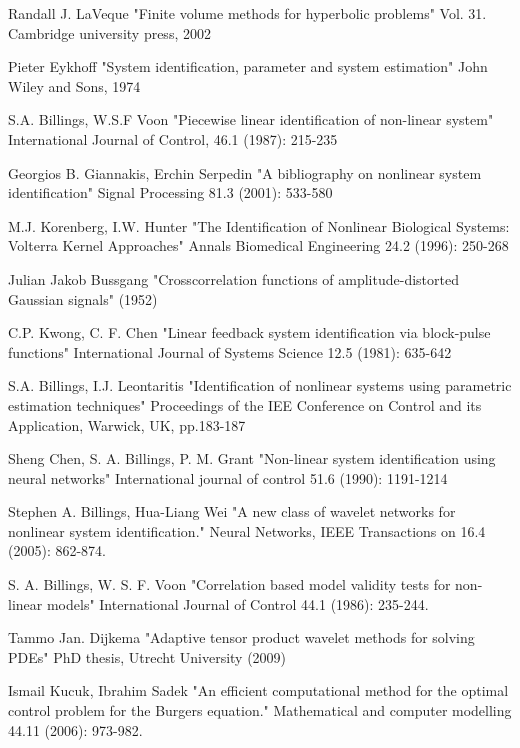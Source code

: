 \documentclass[a4paper,onecolumn]{article}
\theoremstyle{remark}
\begin{document}
\begin{thebibliography}{9}
Randall J. LaVeque
"Finite volume methods for hyperbolic problems"
Vol. 31. Cambridge university press, 2002

Pieter Eykhoff
"System identification, parameter and system estimation"
John Wiley and Sons, 1974

S.A. Billings, W.S.F Voon
"Piecewise linear identification of non-linear system"
International Journal of Control, 46.1 (1987): 215-235

Georgios B. Giannakis, Erchin Serpedin
"A bibliography on nonlinear system identification"
Signal Processing 81.3 (2001): 533-580

M.J. Korenberg, I.W. Hunter
"The Identification of Nonlinear Biological Systems: Volterra Kernel Approaches"
Annals Biomedical Engineering 24.2 (1996): 250-268

Julian Jakob Bussgang
"Crosscorrelation functions of amplitude-distorted Gaussian signals" 
(1952)

C.P. Kwong, C. F. Chen
"Linear feedback system identification via block-pulse functions"
International Journal of Systems Science 12.5 (1981): 635-642

S.A. Billings, I.J. Leontaritis
"Identification of nonlinear systems using parametric estimation techniques"
Proceedings of the IEE Conference on Control and its Application, Warwick, UK, pp.183-187

Sheng Chen, S. A. Billings, P. M. Grant
"Non-linear system identification using neural networks" 
International journal of control 51.6 (1990): 1191-1214

Stephen A. Billings, Hua-Liang Wei
"A new class of wavelet networks for nonlinear system identification."
Neural Networks, IEEE Transactions on 16.4 (2005): 862-874.

S. A. Billings, W. S. F. Voon
"Correlation based model validity tests for non-linear models"
International Journal of Control 44.1 (1986): 235-244.

Tammo Jan. Dijkema
"Adaptive tensor product wavelet methods for solving PDEs"
PhD thesis, Utrecht University (2009)

Ismail Kucuk,  Ibrahim Sadek
"An efficient computational method for the optimal control problem for the Burgers equation." 
Mathematical and computer modelling 44.11 (2006): 973-982.


\end{thebibliography}
\end{document}
